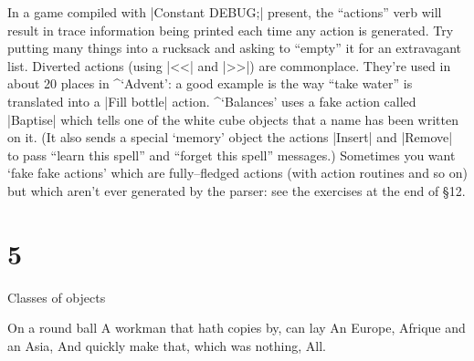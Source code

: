 {{
In a game compiled with |Constant DEBUG;| present, the ``actions''
verb will result in trace information being printed each time any
action is generated.  Try putting many things into a rucksack and
asking to ``empty'' it for an extravagant list.
\nextref
Diverted actions (using |<<| and |>>|) are commonplace.  They're used
in about 20 places in ^{`Advent'}: a good example is the way ``take water''
is translated into a |Fill bottle| action.
\nextref
^{`Balances'} uses a fake action called |Baptise| which tells one
of the white cube objects that a name has been written on it.  (It
also sends a special `memory' object the actions |Insert| and |Remove| to
pass ``learn this spell'' and ``forget this spell'' messages.)
\nextref Sometimes you want `fake fake actions' which are fully--fledged
actions (with action routines and so on) but which aren't ever generated
by the parser: see the exercises at the end of \S 12.

\newpage
\section{5}{Classes of objects}

\widepoem
On a round ball
A workman that hath copies by, can lay
An Europe, Afrique and an Asia,
And quickly make that, which was nothing, All.

}}
